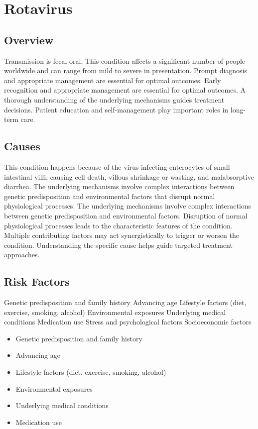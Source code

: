 \chapter{Rotavirus}
\label{sec:Rotavirus}

\section{Overview}
Transmission is fecal-oral. This condition affects a significant number of people worldwide and can range from mild to severe in presentation. Prompt diagnosis and appropriate management are essential for optimal outcomes. Early recognition and appropriate management are essential for optimal outcomes. A thorough understanding of the underlying mechanisms guides treatment decisions. Patient education and self-management play important roles in long-term care.
\section{Causes}
This condition happens because of the virus infecting enterocytes of small intestinal villi, causing cell death, villous shrinkage or wasting, and malabsorptive diarrhea. The underlying mechanisms involve complex interactions between genetic predisposition and environmental factors that disrupt normal physiological processes. The underlying mechanisms involve complex interactions between genetic predisposition and environmental factors. Disruption of normal physiological processes leads to the characteristic features of the condition. Multiple contributing factors may act synergistically to trigger or worsen the condition. Understanding the specific cause helps guide targeted treatment approaches.
\section{Risk Factors}
Genetic predisposition and family history Advancing age Lifestyle factors (diet, exercise, smoking, alcohol) Environmental exposures Underlying medical conditions Medication use Stress and psychological factors Socioeconomic factors

\begin{itemize}[noitemsep]
  \item Genetic predisposition and family history
  \item Advancing age
  \item Lifestyle factors (diet, exercise, smoking, alcohol)
  \item Environmental exposures
  \item Underlying medical conditions
  \item Medication use
\end{itemize}
